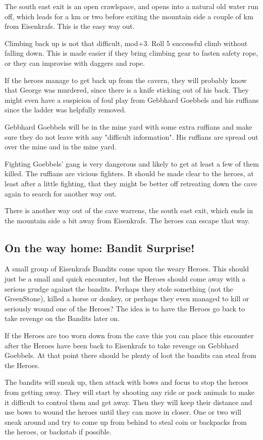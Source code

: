 The south east exit is an open crawlspace, and opens into a natural old water run off, which leads for a km or two before exiting the mountain side a couple of km from Eisenkrafs. This is the easy way out.

Climbing back up is not that difficult, mod+3. Roll 5 successful climb without falling down. This is made easier if they bring climbing gear to fasten safety rope, or they can improvise with daggers and rope.

If the heroes manage to get back up from the cavern, they will probably know that George was murdered, since there is a knife sticking out of his back. They might even have a suspicion of foul play from Gebbhard Goebbels and his ruffians since the ladder was helpfully removed.

Gebbhard Goebbels will be in the mine yard with some extra ruffians and make sure they do not leave with any "difficult information". His ruffians are spread out over the mine and in the mine yard.

Fighting Goebbels' gang is very dangerous and likely to get at least a few of them killed. The ruffians are vicious fighters. It should be made clear to the heroes, at least after a little fighting, that they might be better off retreating down the cave again to search for another way out.

There is another way out of the cave warrens, the south east exit, which ends in the mountain side a bit away from Eisenkrafs. The heroes can escape that way.


\subsection*{On the way home: Bandit Surprise!}
A small group of Eisenkrafs Bandits come upon the weary Heroes. This should just be a small and quick encounter, but the Heroes should come away with a serious grudge against the bandits. Perhaps they stole something (not the GreenStone), killed a horse or donkey, or perhaps they even managed to kill or seriously wound one of the Heroes? The idea is to have the Heroes go back to take revenge on the Bandits later on.

If the Heroes are too worn down from the cave this you can place this encounter after the Heroes have been back to Eisenkrafs to take revenge on Gebbhard Goebbels. At that point there should be plenty of loot the bandits can steal from the Heroes.

The bandits will sneak up, then attack with bows and focus to stop the heroes from getting away. They will start by shooting any ride or pack animals to make it difficult to control them and get away. Then they will keep their distance and use bows to wound the heroes until they can move in closer.
One or two will sneak around and try to come up from behind to steal coin or backpacks from the heroes, or backstab if possible.







